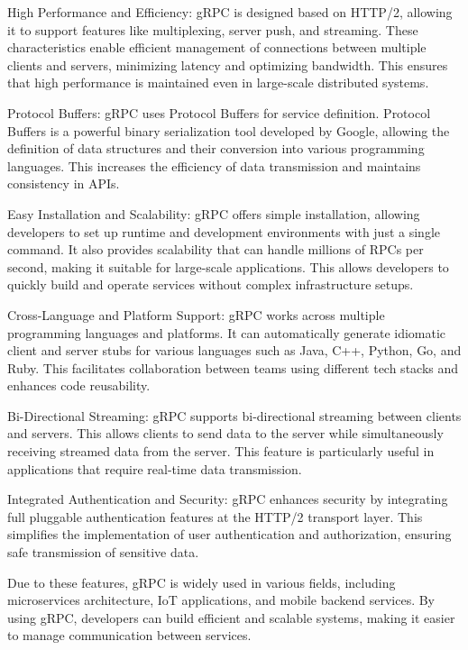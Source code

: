 \documentclass[conference]{IEEEtran}
\begin{document}
\begin{enumerate}[itemsep=2ex, parsep=1ex]
	      High Performance and Efficiency: gRPC is designed based on HTTP/2, allowing
	      it to support features like multiplexing, server push, and streaming.
	      These characteristics enable efficient management of connections between
	      multiple clients and servers, minimizing latency and optimizing bandwidth.
	      This ensures that high performance is maintained even in large-scale
	      distributed systems.
	      	      
	      Protocol Buffers: gRPC uses Protocol Buffers for service definition.
	      Protocol Buffers is a powerful binary serialization tool developed by
	      Google, allowing the definition of data structures and their conversion into
	      various programming languages. This increases the efficiency of data
	      transmission and maintains consistency in APIs.
	      	      
	      Easy Installation and Scalability: gRPC offers simple installation,
	      allowing developers to set up runtime and development environments with
	      just a single command. It also provides scalability that can handle millions
	      of RPCs per second, making it suitable for large-scale applications. This allows
	      developers to quickly build and operate services without complex infrastructure
	      setups.
	      	      
	      Cross-Language and Platform Support: gRPC works across multiple
	      programming languages and platforms. It can automatically generate idiomatic
	      client and server stubs for various languages such as Java, C++, Python,
	      Go, and Ruby. This facilitates collaboration between teams using different
	      tech stacks and enhances code reusability.
	      	      
	      Bi-Directional Streaming: gRPC supports bi-directional streaming between clients
	      and servers. This allows clients to send data to the server while
	      simultaneously receiving streamed data from the server. This feature is particularly
	      useful in applications that require real-time data transmission.
	      	      
	      Integrated Authentication and Security: gRPC enhances security by
	      integrating full pluggable authentication features at the HTTP/2 transport
	      layer. This simplifies the implementation of user authentication and authorization,
	      ensuring safe transmission of sensitive data.
	      	      
	      Due to these features, gRPC is widely used in various fields, including
	      microservices architecture, IoT applications, and mobile backend services.
	      By using gRPC, developers can build efficient and scalable systems, making
	      it easier to manage communication between services.
\end{enumerate}
\end{document}
